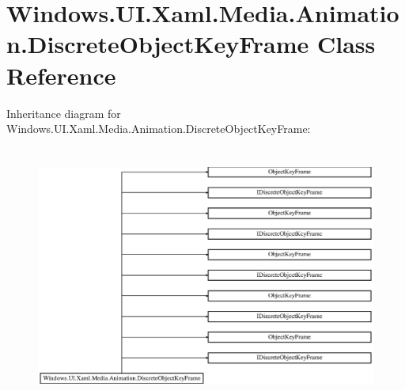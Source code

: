 \hypertarget{class_windows_1_1_u_i_1_1_xaml_1_1_media_1_1_animation_1_1_discrete_object_key_frame}{}\section{Windows.\+U\+I.\+Xaml.\+Media.\+Animation.\+Discrete\+Object\+Key\+Frame Class Reference}
\label{class_windows_1_1_u_i_1_1_xaml_1_1_media_1_1_animation_1_1_discrete_object_key_frame}
Inheritance diagram for Windows.\+U\+I.\+Xaml.\+Media.\+Animation.\+Discrete\+Object\+Key\+Frame\+:\begin{figure}[H]
\begin{center}
\leavevmode
\includegraphics[height=8.531857cm]{class_windows_1_1_u_i_1_1_xaml_1_1_media_1_1_animation_1_1_discrete_object_key_frame}
\end{center}
\end{figure}
